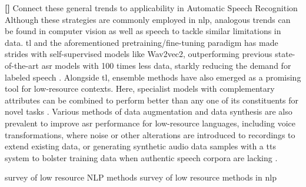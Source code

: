 \documentclass[thesis]{cluu}
\newcounter{paranum}
\newcommand{\numberedparagraph}{\par\refstepcounter{paranum}\textbf{[\theparanum] }}
\begin{document}
\numberedparagraph{Connect these general trends to applicability in Automatic Speech Recognition}
Although these strategies are commonly employed in \gls{nlp}, analogous trends can be found in computer vision as well as speech to tackle similar limitations in data. \gls{tl} and the aforementioned pretraining/fine-tuning paradigm has made strides with self-supervised models like Wav2vec2, outperforming previous state-of-the-art \gls{asr} models with 100 times less data, starkly reducing the demand for labeled speech \parencite{baevskiWav2vec20Framework2020a}. Alongside \gls{tl}, ensemble methods have also emerged as a promising tool for low-resource contexts. Here, specialist models with complementary attributes can be combined to perform better than any one of its constituents for novel tasks \parencite[inter alia]{arunkumarInvestigationEnsembleFeatures2022,dengEnsembleDeepLearning2014,gitmanConfidencebasedEnsemblesEndtoEnd2023,fiscus1997post}. Various methods of data augmentation and data synthesis are also prevalent to improve \gls{asr} performance for low-resource languages, including voice transformations, where noise or other alterations are introduced to recordings to extend existing data, or generating synthetic audio data samples with a \gls{tts} system to bolster training data when authentic speech corpora are lacking \parencite{barteldsMakingMoreLittle2023,zhangL2GENNeuralPhoneme2022}.

\textcite{hedderichSurveyRecentApproaches2021} survey of low resource NLP methods
\textcite{magueresseLowresourceLanguagesReview2020} survey of low resource methods in \gls{nlp}
\end{document}

